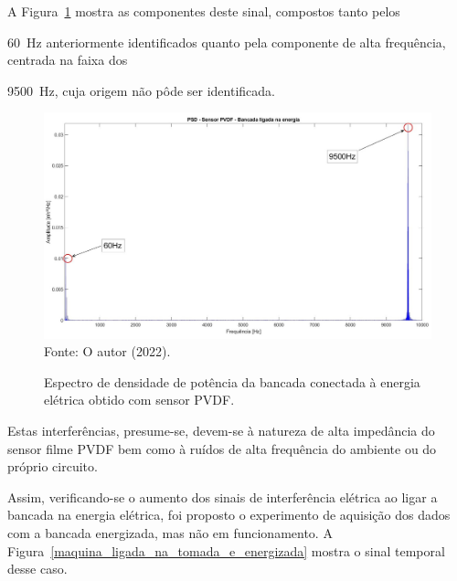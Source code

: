 \documentclass[
	12pt,				
	oneside,			
	a4paper,			
	english,			
	brazil,	
	sumario=abnt-6027-2012		
	]{abntex2ppgsi}
\begin{document}
{{A Figura~\ref{PSD_SENSOR_MAQUINA_LIGADA} mostra as componentes deste sinal, compostos tanto pelos {\SI{60}{\hertz} anteriormente identificados quanto pela componente de alta frequência, centrada na faixa dos {\SI{9500}{\hertz}, cuja origem não pôde ser identificada. 

\begin{figure}[H]
\centering
\caption {Espectro de densidade de potência da bancada conectada à energia elétrica obtido com sensor PVDF.}
\includegraphics[width=170mm,keepaspectratio]{PSD_PVDF_MAQUINA_LIGADA} \\
Fonte: O autor (2022).
\label{PSD_SENSOR_MAQUINA_LIGADA}
\end{figure} 

Estas interferências, presume-se, devem-se à natureza de alta impedância do sensor filme PVDF bem como à ruídos de alta frequência do ambiente ou do próprio circuito.  

Assim, verificando-se o aumento dos sinais de interferência elétrica ao ligar a bancada na energia elétrica, foi proposto o experimento de aquisição dos dados com a bancada energizada, mas não em funcionamento. A Figura~\ref{maquina_ligada_na_tomada_e_energizada} mostra o sinal temporal desse caso.

}}}}
\end{document}
